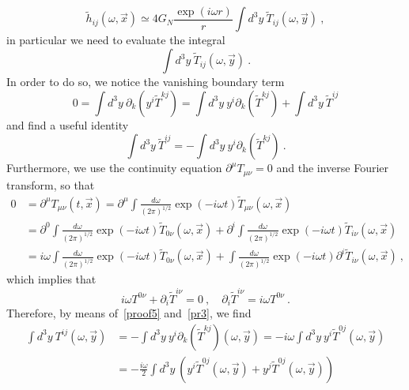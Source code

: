 \documentclass[a4paper]{article}
\begin{document}
    \begin{equation*}
        \tilde h_{ij} (\omega, \vec x) \simeq 4 G_N \frac{\exp(i \omega r)}{r} \int d^3 y ~ \tilde T_{ij} (\omega, \vec{y}) ~,
    \end{equation*}
    in particular we need to evaluate the integral
    \begin{equation*}
        \int d^3 y ~ \tilde T_{ij} (\omega, \vec{y}) ~.
    \end{equation*}
    In order to do so, we notice the vanishing boundary term
    \begin{equation*}
        0 = \int d^3 y ~ \partial_k (y^i \tilde T^{kj}) = \int d^3 y ~ y^i \partial_k (\tilde T^{kj}) + \int d^3 y ~ \tilde T^{ij}
    \end{equation*}
    and find a useful identity
    \begin{equation}\label{proof5}
        \int d^3 y ~ \tilde T^{ij} = - \int d^3 y ~ y^i \partial_k (\tilde T^{kj}) ~.
    \end{equation}
    Furthermore, we use the continuity equation $\partial^\mu T_{\mu \nu} = 0$ and the inverse Fourier transform, so that 
    \begin{equation*}
    \begin{aligned}
        0 & = \partial^\mu  T_{\mu\nu} (t, \vec x) = \partial^\mu \int \frac{d\omega}{(2\pi)^{1/2}} \exp(- i \omega t) \tilde  T_{\mu\nu} (\omega, \vec x) \\ & = \partial^0 \int \frac{d\omega}{(2\pi)^{1/2}} \exp(- i \omega t) \tilde  T_{0\nu} (\omega, \vec x) + \partial^i \int \frac{d\omega}{(2\pi)^{1/2}} \exp(- i \omega t) \tilde  T_{i\nu} (\omega, \vec x) \\ & = i \omega \int \frac{d\omega}{(2\pi)^{1/2}} \exp(- i \omega t) \tilde  T_{0\nu} (\omega, \vec x) + \int \frac{d\omega}{(2\pi)^{1/2}} \exp(- i \omega t) \partial^i \tilde  T_{i\nu} (\omega, \vec x) ~,
    \end{aligned}
    \end{equation*}
    which implies that 
    \begin{equation}\label{pr3}
        i \omega T^{0 \nu} + \partial_i \tilde T^{i \nu} = 0 ~, \quad \partial_i \tilde T^{i \nu} = i \omega T^{0 \nu} ~.
    \end{equation}
    Therefore, by means of~\eqref{proof5} and~\eqref{pr3}, we find 
    \begin{equation*}
    \begin{aligned}
        \int d^3 y ~ T^{ij} (\omega, \vec y) & = - \int d^3 y ~ y^i \partial_k (\tilde T^{kj}) (\omega, \vec y) = - i \omega \int d^3 y ~ y^i \tilde T^{0j} (\omega, \vec y) \\ & = - \frac{i \omega}{2} \int d^3 y ~ (y^i \tilde T^{0j} (\omega, \vec y) + y^j \tilde T^{0j} (\omega, \vec y)) 
    \end{aligned}
    \end{equation*}
\end{document}
